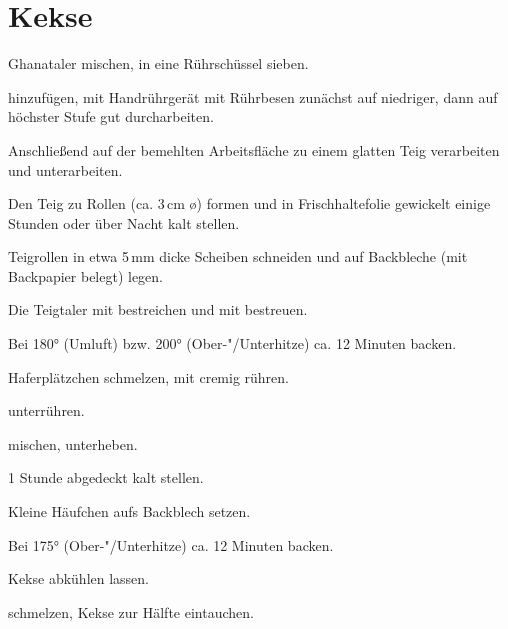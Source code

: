 \section{Kekse}

\begin{recipe}{Ghanataler}
  mischen, in eine Rührschüssel sieben.

  hinzufügen, mit Handrührgerät mit Rührbesen zunächst auf niedriger,
  dann auf höchster Stufe gut durcharbeiten.

  Anschließend auf der bemehlten Arbeitsfläche zu einem glatten Teig
  verarbeiten und
  unterarbeiten.

  Den Teig zu Rollen (ca. 3\,cm \o) formen und in Frischhaltefolie gewickelt
  einige Stunden oder über Nacht kalt stellen.

  Teigrollen in etwa 5\,mm dicke Scheiben schneiden und auf Backbleche
  (mit Backpapier belegt) legen.

  Die Teigtaler mit
  bestreichen und mit
  bestreuen.

  Bei 180° (Umluft) bzw. 200° (Ober-"/Unterhitze) ca. 12 Minuten backen.
\end{recipe}



\begin{recipe}{Haferplätzchen}
  schmelzen, mit
  cremig rühren.

  unterrühren.

  mischen, unterheben.

  1 Stunde abgedeckt kalt stellen.

  Kleine Häufchen aufs Backblech setzen.

  Bei 175° (Ober-"/Unterhitze) ca. 12 Minuten backen.

  Kekse abkühlen lassen.

  schmelzen, Kekse zur Hälfte eintauchen.
\end{recipe}



